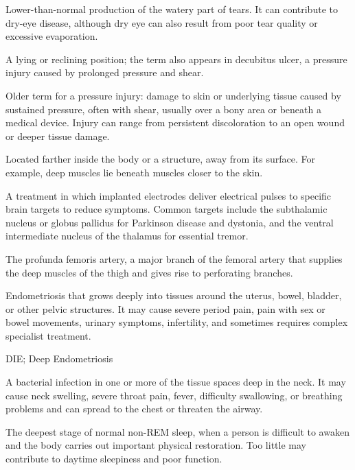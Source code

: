  Lower-than-normal production of the watery part of tears. It can contribute to dry-eye disease, although dry eye can also result from poor tear quality or excessive evaporation.


 A lying or reclining position; the term also appears in decubitus ulcer, a pressure injury caused by prolonged pressure and shear.

 Older term for a pressure injury: damage to skin or underlying tissue caused by sustained pressure, often with shear, usually over a bony area or beneath a medical device. Injury can range from persistent discoloration to an open wound or deeper tissue damage.

 Located farther inside the body or a structure, away from its surface. For example, deep muscles lie beneath muscles closer to the skin.

 A treatment in which implanted electrodes deliver electrical pulses to specific brain targets to reduce symptoms. Common targets include the subthalamic nucleus or globus pallidus for Parkinson disease and dystonia, and the ventral intermediate nucleus of the thalamus for essential tremor.

 The profunda femoris artery, a major branch of the femoral artery that supplies the deep muscles of the thigh and gives rise to perforating branches.

 Endometriosis that grows deeply into tissues around the uterus, bowel, bladder, or other pelvic structures. It may cause severe period pain, pain with sex or bowel movements, urinary symptoms, infertility, and sometimes requires complex specialist treatment.

\synonyms
DIE; Deep Endometriosis

 A bacterial infection in one or more of the tissue spaces deep in the neck. It may cause neck swelling, severe throat pain, fever, difficulty swallowing, or breathing problems and can spread to the chest or threaten the airway.

 The deepest stage of normal non-REM sleep, when a person is difficult to awaken and the body carries out important physical restoration. Too little may contribute to daytime sleepiness and poor function.

